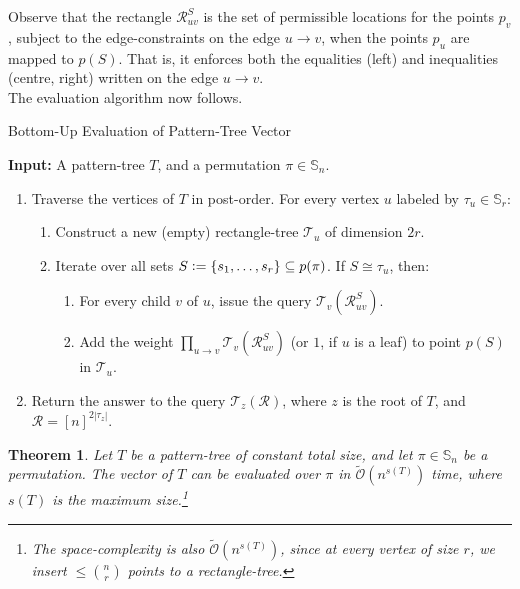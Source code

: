 \documentclass{article}
\newtheorem{theorem}{Theorem}[section]
\newcommand{\eqdef}{\vcentcolon=}
\theoremstyle{remark}
\newcommand{\Otilde}[1]{\widetilde{\mathcal{O}}\left( #1 \right)}
\theoremstyle{plain}
\begin{document}
Observe that the rectangle $\mathcal{R}_{uv}^S$ is the set of permissible
locations for the points $p_v$, subject to the edge-constraints on the edge $u \to v$,
when the points $p_u$ are mapped to $p(S)$. That is, it enforces both the equalities (left)
and inequalities (centre, right) written on the edge $u \to v$.\ \\

The evaluation algorithm now follows.

\begin{algorithm}[H]
\caption{Bottom-Up Evaluation of Pattern-Tree Vector}
\label{alg:bottom_up_pattern_tree}
\vspace{0.2cm}\hspace*{\algorithmicindent} \textbf{Input:} A pattern-tree $T$, and a permutation $\pi \in \mathbb{S}_n$. 
\begin{enumerate}
    \item Traverse the vertices of $T$ in post-order. For every vertex $u$ labeled by $\tau_u \in \mathbb{S}_r$:
    \begin{enumerate}
        \item Construct a new (empty) rectangle-tree $\mathcal{T}_u$ of dimension $2r$.
        \item Iterate over all sets $S \eqdef \{ s_1, \dots, s_r\} \subseteq p(\pi)$. If $S \cong \tau_u$, then:
        \begin{enumerate}
            \item For every child $v$ of $u$, issue the query $\mathcal{T}_v(\mathcal{R}_{uv}^S)$.
            \item Add the weight $\prod_{u \to v} \mathcal{T}_v(\mathcal{R}_{uv}^S)$ (or $1$, if $u$ is a leaf) to point $p(S)$ in $\mathcal{T}_u$.
        \end{enumerate}
    \end{enumerate}
    \item Return the answer to the query $\mathcal{T}_{z}(\mathcal{R})$, where $z$ is the root of $T$, and $\mathcal{R} = [n]^{2 |\tau_z|}$.
\end{enumerate}
\end{algorithm}
\begin{theorem}
    \label{thm:computing_pattern_trees}
    Let $T$ be a pattern-tree of constant total size, and let $\pi \in \mathbb{S}_n$ be a permutation.
    The vector of $T$ can be evaluated over $\pi$ in $\Otilde{n^{s(T)}}$ time, where $s(T)$ is the \textit{maximum size}.\footnote{
        The space-complexity is also $\Otilde{n^{s(T)}}$,
        since at every vertex of size $r$, we insert $\le \binom{n}{r}$ points to a rectangle-tree.
    }
\end{theorem}
\end{document}
